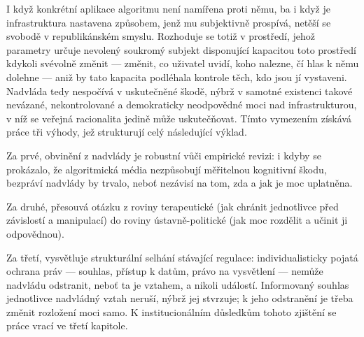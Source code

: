 I když konkrétní aplikace algoritmu není namířena proti němu, ba i když je infrastruktura nastavena způsobem, jenž mu subjektivně prospívá, netěší se svobodě v republikánském smyslu.
Rozhoduje se totiž v prostředí, jehož parametry určuje nevolený soukromý subjekt disponující kapacitou toto prostředí kdykoli svévolně změnit — změnit, co uživatel uvidí, koho nalezne, čí hlas k němu dolehne — aniž by tato kapacita podléhala kontrole těch, kdo jsou jí vystaveni.
Nadvláda tedy nespočívá v uskutečněné škodě, nýbrž v samotné existenci takové nevázané, nekontrolované a demokraticky neodpovědné moci nad infrastrukturou, v níž se veřejná racionalita jedině může uskutečňovat.
Tímto vymezením získává práce tři výhody, jež strukturují celý následující výklad.


Za prvé, obvinění z nadvlády je robustní vůči empirické revizi: i kdyby se prokázalo, že algoritmická média nezpůsobují měřitelnou kognitivní škodu, bezpráví nadvlády by trvalo, neboť nezávisí na tom, zda a jak je moc uplatněna.


Za druhé, přesouvá otázku z roviny terapeutické (jak chránit jednotlivce před závislostí a manipulací) do roviny ústavně-politické (jak moc rozdělit a učinit ji odpovědnou).


Za třetí, vysvětluje strukturální selhání stávající regulace: individualisticky pojatá ochrana práv — souhlas, přístup k datům, právo na vysvětlení — nemůže nadvládu odstranit, neboť ta je vztahem, a nikoli událostí.
Informovaný souhlas jednotlivce nadvládný vztah neruší, nýbrž jej stvrzuje; k jeho odstranění je třeba změnit rozložení moci samo.
K institucionálním důsledkům tohoto zjištění se práce vrací ve třetí kapitole.